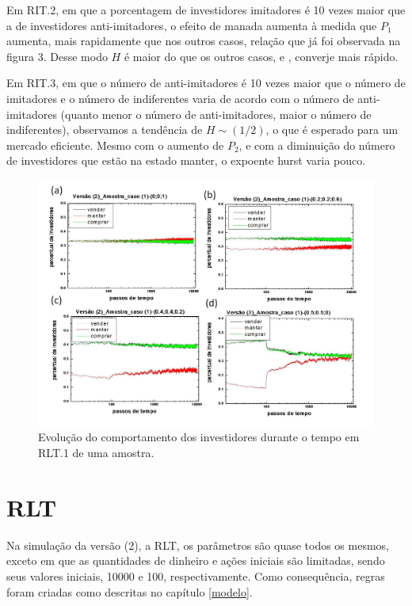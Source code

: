 \documentclass[brazil,ruledheader]{abnt}
\begin{document}
Em RIT.2, em que a porcentagem de investidores imitadores é 10 vezes
maior que a de investidores anti-imitadores, o efeito de manada aumenta à medida
que $P_1$ aumenta, mais rapidamente que nos outros casos, relação que já foi
observada na figura 3. Desse modo $H$ é maior do que os outros
casos, e , converje mais rápido.	

Em RIT.3, em que o número de anti-imitadores é
10 vezes maior que o número de imitadores e o número de indiferentes varia de
acordo com o número de anti-imitadores (quanto menor o número de
anti-imitadores, maior o número de indiferentes), observamos a tendência de
$H\sim (1/2)$, o que é esperado para um mercado eficiente. Mesmo com o aumento
de
$P_2$, e com a diminuição do número de investidores que estão na estado manter,
o expoente hurst varia pouco.





\begin{figure}[!h]
\centering
\includegraphics[width=0.8\linewidth]{Figuras/12.jpg}
\caption [Evolução do comportamento dos investidores em RLT.1]{Evolução do
comportamento dos investidores durante o tempo em RLT.1 de uma amostra. }
\label{fig:evolucao-comportamento4}
\end{figure}

\section{RLT}

Na simulação da versão (2), a RLT, os parâmetros são quase todos os mesmos,
exceto em que as quantidades de dinheiro e ações iniciais são limitadas, sendo
seus
valores iniciais, 10000 e 100, respectivamente.  Como consequência, regras foram
criadas como descritas no capítulo \ref{modelo}.
\end{document}
